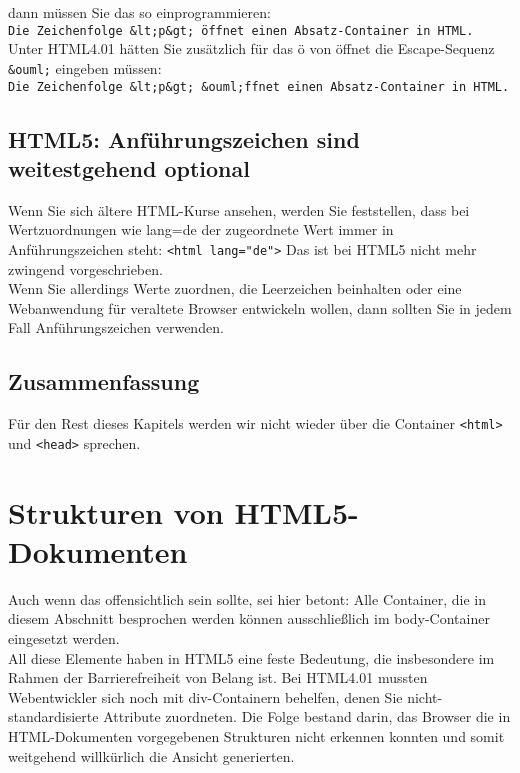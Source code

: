 dann müssen Sie das so einprogrammieren:\\

\verb|Die Zeichenfolge &lt;p&gt; öffnet einen Absatz-Container in HTML.|\\

Unter HTML4.01 hätten Sie zusätzlich für das ö von öffnet die Escape-Sequenz \verb|&ouml;| eingeben müssen:\\

\verb|Die Zeichenfolge &lt;p&gt; &ouml;ffnet einen Absatz-Container in HTML.|

\subsection{HTML5: Anführungszeichen sind weitestgehend optional}

Wenn Sie sich ältere HTML-Kurse ansehen, werden Sie feststellen, dass bei Wertzuordnungen wie lang=de der zugeordnete Wert immer in Anführungszeichen steht: \verb|<html lang="de">| Das ist bei HTML5 nicht mehr zwingend vorgeschrieben. \\

Wenn Sie allerdings Werte zuordnen, die Leerzeichen beinhalten oder eine Webanwendung für veraltete Browser entwickeln wollen, dann sollten Sie in jedem Fall Anführungszeichen verwenden.

\subsection{Zusammenfassung}

Für den Rest dieses Kapitels werden wir nicht wieder über die Container \verb|<html>| und \verb|<head>| sprechen.

\section{Strukturen von HTML5-Dokumenten}

Auch wenn das offensichtlich sein sollte, sei hier betont: Alle Container, die in diesem Abschnitt besprochen werden können ausschließlich im body-Container eingesetzt werden.\\

All diese Elemente haben in HTML5 eine feste Bedeutung, die insbesondere im Rahmen der Barrierefreiheit von Belang ist. Bei HTML4.01 mussten Webentwickler sich noch mit div-Containern behelfen, denen Sie nicht-standardisierte Attribute zuordneten. Die Folge bestand darin, das Browser die in HTML-Dokumenten vorgegebenen Strukturen nicht erkennen konnten und somit weitgehend willkürlich die Ansicht generierten.\\

